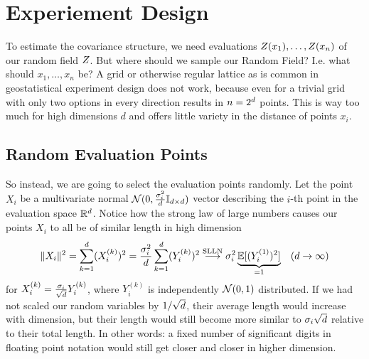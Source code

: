 \section{Experiement Design}

To estimate the covariance structure, we need evaluations
\(Z(x_1),\dots,Z(x_n)\) of our random
field \(Z\). But where should we sample our Random Field? I.e. what should
\(x_1,\dots, x_n\) be? A grid or otherwise regular lattice as is common in
geostatistical experiment design \parencite[e.g.][Section 4.1]{mullerCollectingSpatialData2007} does not work, because even for a trivial
grid with only two options in every direction results in \(n=2^d\) points.
This is way too much for high dimensions \(d\) and offers little variety in
the distance of points \(x_i\).

\subsection{Random Evaluation Points}

So instead, we are going to select the evaluation points randomly. Let the point
\(X_i\) be a multivariate normal \(\mathcal{N}(0,\frac{\sigma_i^2}{d}
\mathbb{I}_{d\times d})\) vector describing the \(i\)-th point
in the evaluation space \(\mathbb{R}^d\). Notice how the strong law of large
numbers causes our points \(X_i\) to all be of similar length in high dimension
\[
	\|X_i\|^2 = \sum_{k=1}^d (X_i^{(k)})^2
	= \frac{\sigma_i^2}{d} \sum_{k=1}^d (Y_i^{(k)})^2 
	\overset{\text{SLLN}}\longrightarrow\sigma_i^2\underbrace{\mathbb{E}[(Y_i^{(1)})^2]}_{=1} \quad (d\to \infty)
\]
for \(X_i^{(k)} = \frac{\sigma_i}{\sqrt{d}}Y_i^{(k)}\), where \(Y_i^{(k)}\) is
independently \(\mathcal{N}(0,1)\) distributed. If we had not scaled our random
variables by \(1/{\sqrt{d}}\), their average length would increase
with dimension, but their length would still become more similar to
\(\sigma_i\sqrt{d}\) relative to their total length. In other words:
a fixed number of significant digits in floating point notation would still get
closer and closer in higher dimension.

